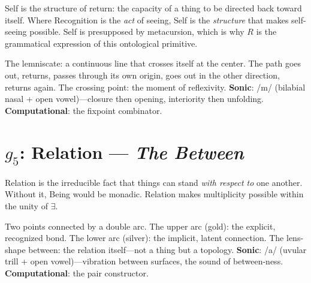 \documentclass[12pt, letterpaper]{book}
\def\circlearrowleft{R}%
\def\mathfrak#1{#1}%
\newcommand{\E}{\exists}                          %
\begin{document}
Self is the structure of return: the capacity of a thing to be directed back toward itself. Where Recognition is the \textit{act} of seeing, Self is the \textit{structure} that makes self-seeing possible. Self is presupposed by metacursion, which is why $\circlearrowleft$ is the grammatical expression of this ontological primitive.

\begin{center}
\end{center}

The lemniscate: a continuous line that crosses itself at the center. The path goes out, returns, passes through its own origin, goes out in the other direction, returns again. The crossing point: the moment of reflexivity. \textbf{Sonic}: /m\textscripta/ (bilabial nasal + open vowel)---closure then opening, interiority then unfolding. \textbf{Computational}: the fixpoint combinator.



\section{$\mathfrak{g}_5$: Relation --- \textit{The Between}}

Relation is the irreducible fact that things can stand \textit{with respect to} one another. Without it, Being would be monadic. Relation makes multiplicity possible within the unity of $\E$.

\begin{center}
\end{center}

Two points connected by a double arc. The upper arc (gold): the explicit, recognized bond. The lower arc (silver): the implicit, latent connection. The lens-shape between: the relation itself---not a thing but a topology. \textbf{Sonic}: /\textinvscr a/ (uvular trill + open vowel)---vibration between surfaces, the sound of between-ness. \textbf{Computational}: the pair constructor.
\end{document}
